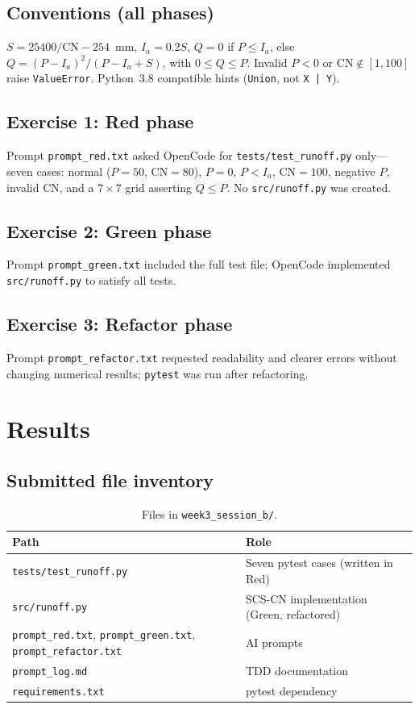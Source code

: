 \documentclass[11pt,a4paper]{article}
\begin{document}
\subsection{Conventions (all phases)}
$S = 25400/\mathrm{CN} - 254$~mm, $I_a = 0.2S$, $Q=0$ if $P \le I_a$, else $Q=(P-I_a)^2/(P-I_a+S)$, with $0 \le Q \le P$. Invalid $P<0$ or $\mathrm{CN}\notin[1,100]$ raise \texttt{ValueError}. Python~3.8 compatible hints (\texttt{Union}, not \texttt{X | Y}).

\subsection{Exercise 1: Red phase}
Prompt \texttt{prompt\_red.txt} asked OpenCode for \texttt{tests/test\_runoff.py} only---seven cases: normal ($P=50$, $\mathrm{CN}=80$), $P=0$, $P<I_a$, $\mathrm{CN}=100$, negative $P$, invalid $\mathrm{CN}$, and a $7\times7$ grid asserting $Q \le P$. No \texttt{src/runoff.py} was created.

\subsection{Exercise 2: Green phase}
Prompt \texttt{prompt\_green.txt} included the full test file; OpenCode implemented \texttt{src/runoff.py} to satisfy all tests.

\subsection{Exercise 3: Refactor phase}
Prompt \texttt{prompt\_refactor.txt} requested readability and clearer errors without changing numerical results; \texttt{pytest} was run after refactoring.

\section{Results}

\subsection{Submitted file inventory}
\begin{table}[htbp]
  \centering
  \caption{Files in \texttt{week3\_session\_b/}.}
  \label{tab:files}
  \small
  \begin{tabular}{@{}ll@{}}
    \toprule
    Path & Role \\
    \midrule
    \texttt{tests/test\_runoff.py} & Seven pytest cases (written in Red) \\
    \texttt{src/runoff.py} & SCS-CN implementation (Green, refactored) \\
    \texttt{prompt\_red.txt}, \texttt{prompt\_green.txt}, \texttt{prompt\_refactor.txt} & AI prompts \\
    \texttt{prompt\_log.md} & TDD documentation \\
    \texttt{requirements.txt} & pytest dependency \\
    \bottomrule
  \end{tabular}
\end{table}
\end{document}
